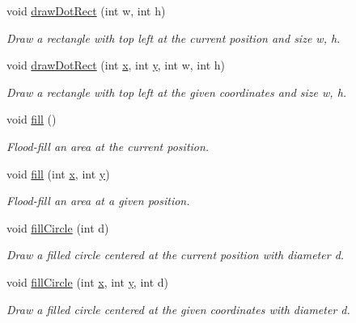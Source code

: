 \begin{DoxyCompactItemize}
void \hyperlink{classGUI_1_1Drawable_a82eda1e46a9c3bdbbfd29706960d2a0b}{draw\-Dot\-Rect} (int w, int h)
\begin{DoxyCompactList}\small\item\em Draw a rectangle with top left at the current position and size {\ttfamily w}, {\ttfamily h}. \end{DoxyCompactList}\item 
void \hyperlink{classGUI_1_1Drawable_a173860d00ff795adfd7eaca64bb06cda}{draw\-Dot\-Rect} (int \hyperlink{classGUI_1_1Drawable_a098294925bd310aa41080a2441790b80}{x}, int \hyperlink{classGUI_1_1Drawable_a574c99954cc268937f2c66ebe1332316}{y}, int w, int h)
\begin{DoxyCompactList}\small\item\em Draw a rectangle with top left at the given coordinates and size {\ttfamily w}, {\ttfamily h}. \end{DoxyCompactList}\item 
void \hyperlink{classGUI_1_1Drawable_acdff088e5bc17e7024353aac19c178c6}{fill} ()
\begin{DoxyCompactList}\small\item\em Flood-\/fill an area at the current position. \end{DoxyCompactList}\item 
void \hyperlink{classGUI_1_1Drawable_a87379f6a31eb6399616133d33d24cc11}{fill} (int \hyperlink{classGUI_1_1Drawable_a098294925bd310aa41080a2441790b80}{x}, int \hyperlink{classGUI_1_1Drawable_a574c99954cc268937f2c66ebe1332316}{y})
\begin{DoxyCompactList}\small\item\em Flood-\/fill an area at a given position. \end{DoxyCompactList}\item 
void \hyperlink{classGUI_1_1Drawable_a7c8bdd25268ee6b6fe28a8477d940273}{fill\-Circle} (int d)
\begin{DoxyCompactList}\small\item\em Draw a filled circle centered at the current position with diameter {\ttfamily d}. \end{DoxyCompactList}\item 
void \hyperlink{classGUI_1_1Drawable_aa6fbf7f2c20f1d7c5f37af4e5dc6e3f5}{fill\-Circle} (int \hyperlink{classGUI_1_1Drawable_a098294925bd310aa41080a2441790b80}{x}, int \hyperlink{classGUI_1_1Drawable_a574c99954cc268937f2c66ebe1332316}{y}, int d)
\begin{DoxyCompactList}\small\item\em Draw a filled circle centered at the given coordinates with diameter {\ttfamily d}. \end{DoxyCompactList}\item 

\end{DoxyCompactItemize}
